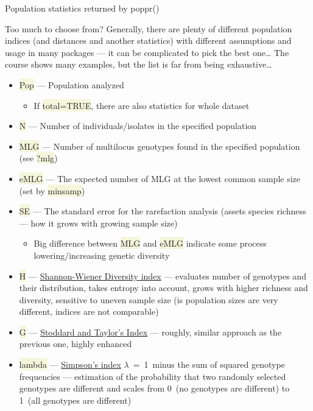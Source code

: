 \documentclass[compress, ucs, xelatex, 11pt, xcolor=svgnames, aspectratio=169,
	hyperref={
		bookmarks=true,
		unicode=true,
		colorlinks=true,
		pdftitle={Molecular data in R},
		plainpages=false,
		pdfauthor={Vojtech Zeisek},
		pdfsubject={Course about phylogeny and evolution in R},
		pdfcreator={XeLaTeX},
		pdfkeywords={R, evolution, phylogeny, molecular data},
		linkcolor=Crimson, %
		anchorcolor=Magenta, %
		citecolor=Magenta, %
		filecolor=Magenta, %
		menucolor=Magenta, %
		urlcolor=DodgerBlue, %
		pdftex},
	url={hyphens, lowtilde} %
	]{beamer}
\renewcommand{\texttt}[1]{\colorbox{Beige}{{\ttfamily #1}}}
\begin{document}
\begin{frame}[allowframebreaks]{Population statistics returned by poppr()}
	\begin{block}{Too much to choose from?}
		Generally, there are plenty of different population indices (and distances and another statistics) with different assumptions and usage in many packages --- it can be complicated to pick the best one\ldots{ }The course shows many examples, but the list is far from being exhaustive\ldots
	\end{block}
	\begin{itemize}
		\item \texttt{Pop} --- Population analyzed
		\begin{itemize}
			\item If \texttt{total=TRUE}, there are also statistics for whole dataset
		\end{itemize}
		\item \texttt{N} --- Number of individuals/isolates in the specified population
		\item \texttt{MLG} --- Number of multilocus genotypes found in the specified population (see \texttt{?mlg})
		\item \texttt{eMLG} --- The expected number of MLG at the lowest common sample size (set by \texttt{minsamp})
		\item \texttt{SE} --- The standard error for the rarefaction analysis (assets species richness --- how it grows with growing sample size)
		\begin{itemize}
			\item Big difference between \texttt{MLG} and \texttt{eMLG} indicate some process lowering/increasing genetic diversity
		\end{itemize}
		\item \texttt{H} --- \href{https://en.wikipedia.org/wiki/Diversity_index\#Shannon_index}{Shannon-Wiener Diversity index} --- evaluates number of genotypes and their distribution, takes entropy into account, grows with higher richness and diversity, sensitive to uneven sample size (is population sizes are very different, indices are not comparable)
		\item \texttt{G} --- \href{https://academic.oup.com/genetics/article/118/4/705/5997522}{Stoddard and Taylor's Index} --- roughly, similar approach as the previous one, highly enhanced
		\item \texttt{lambda} --- \href{https://en.wikipedia.org/wiki/Diversity_index\#Simpson_index}{Simpson's index} $\lambda$~=~1~minus the sum of squared genotype frequencies --- estimation of the probability that two randomly selected genotypes are different and scales from 0~(no genotypes are different) to 1~(all genotypes are different)

\end{itemize}
\end{frame}
\end{document}
